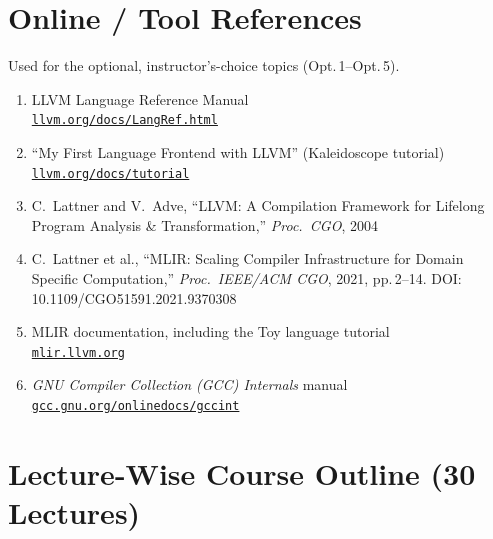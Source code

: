\documentclass{article}
\begin{document}
\section*{Online / Tool References}
Used for the optional, instructor's-choice topics (Opt.\,1--Opt.\,5).
\begin{enumerate}
    \item[{[LLVM-LR]}] LLVM Language Reference Manual \\
    \href{https://llvm.org/docs/LangRef.html}{\small\texttt{llvm.org/docs/LangRef.html}}
    \item[{[LLVM-KA]}] ``My First Language Frontend with LLVM'' (Kaleidoscope tutorial) \\
    \href{https://llvm.org/docs/tutorial/}{\small\texttt{llvm.org/docs/tutorial}}
    \item[{[LLVM]}] C.~Lattner and V.~Adve, ``LLVM: A Compilation Framework for Lifelong Program Analysis \& Transformation,'' \textit{Proc.\ CGO}, 2004
    \item[{[MLIR]}] C.~Lattner et al., ``MLIR: Scaling Compiler Infrastructure for Domain Specific Computation,'' \textit{Proc.\ IEEE/ACM CGO}, 2021, pp.\,2--14. DOI: 10.1109/CGO51591.2021.9370308
    \item[{[MLIR-DOC]}] MLIR documentation, including the Toy language tutorial \\
    \href{https://mlir.llvm.org/}{\small\texttt{mlir.llvm.org}}
    \item[{[GCC-INT]}] \textit{GNU Compiler Collection (GCC) Internals} manual \\
    \href{https://gcc.gnu.org/onlinedocs/gccint/}{\small\texttt{gcc.gnu.org/onlinedocs/gccint}}
\end{enumerate}


\section*{Lecture-Wise Course Outline (30 Lectures)}
\end{document}
